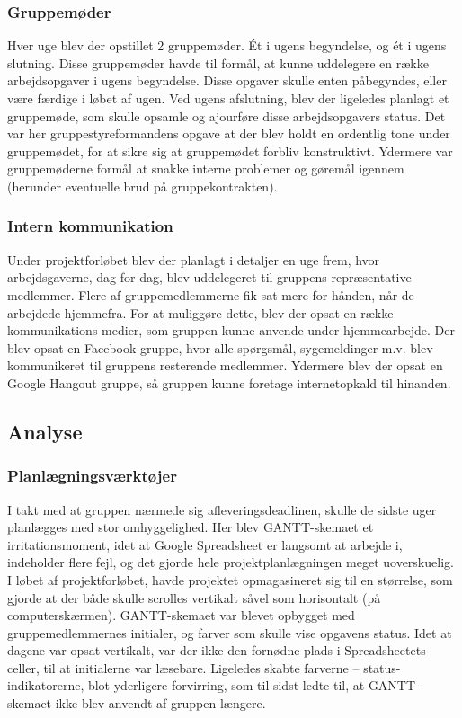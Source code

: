 \subsubsection{Gruppemøder}
Hver uge blev der opstillet 2 gruppemøder. Ét i ugens begyndelse, og ét i ugens slutning. Disse gruppemøder havde til formål, at kunne uddelegere en række arbejdsopgaver i ugens begyndelse. Disse opgaver skulle enten påbegyndes, eller være færdige i løbet af ugen. Ved ugens afslutning, blev der ligeledes planlagt et gruppemøde, som skulle opsamle og ajourføre disse arbejdsopgavers status. Det var her gruppestyreformandens opgave at der blev holdt en ordentlig tone under gruppemødet, for at sikre sig at gruppemødet forbliv konstruktivt. Ydermere var gruppemøderne formål at snakke interne problemer og gøremål igennem (herunder eventuelle brud på gruppekontrakten). \\

\subsubsection{Intern kommunikation}
Under projektforløbet blev der planlagt i detaljer en uge frem, hvor arbejdsgaverne, dag for dag, blev uddelegeret til gruppens repræsentative medlemmer. Flere af gruppemedlemmerne fik sat mere for hånden, når de arbejdede hjemmefra. For at muliggøre dette, blev der opsat en række kommunikations-medier, som gruppen kunne anvende under hjemmearbejde. Der blev opsat en Facebook-gruppe, hvor alle spørgsmål, sygemeldinger m.v. blev kommunikeret til gruppens resterende medlemmer. Ydermere blev der opsat en Google Hangout gruppe, så gruppen kunne foretage internetopkald til hinanden.

\subsection{Analyse}
\subsubsection{Planlægningsværktøjer}
I takt med at gruppen nærmede sig afleveringsdeadlinen, skulle de sidste uger planlægges med stor omhyggelighed. Her blev GANTT-skemaet et irritationsmoment, idet at Google Spreadsheet er langsomt at arbejde i, indeholder flere fejl, og det gjorde hele projektplanlægningen meget uoverskuelig. I løbet af projektforløbet, havde projektet opmagasineret sig til en størrelse, som gjorde at der både skulle scrolles vertikalt såvel som horisontalt (på computerskærmen). GANTT-skemaet var blevet opbygget med gruppemedlemmernes initialer, og farver som skulle vise opgavens status. Idet at dagene var opsat vertikalt, var der ikke den fornødne plads i Spreadsheetets celler, til at initialerne var læsebare. Ligeledes skabte farverne – status-indikatorerne, blot yderligere forvirring, som til sidst ledte til, at GANTT-skemaet ikke blev anvendt af gruppen længere. \\

